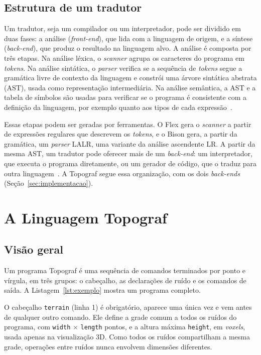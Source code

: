 \documentclass[sigconf, nonacm, screen, language=portuguese, language={main=english}]{acmart}
\begin{document}
\subsection{Estrutura de um tradutor}\label{sec:compiladores}
Um tradutor, seja um compilador ou um interpretador, pode ser dividido
em duas fases: a análise
(\textit{front-end}), que lida com a linguagem de origem, e a síntese
(\textit{back-end}), que produz o resultado na linguagem
alvo. A análise é composta por três etapas. Na análise
léxica, o \textit{scanner} agrupa os caracteres do programa em
\textit{tokens}. Na análise sintática, o \textit{parser} verifica se a
sequência de \textit{tokens} segue a gramática livre de contexto da
linguagem e constrói uma árvore sintática abstrata (AST), usada como
representação intermediária. Na análise semântica, a AST e a tabela de
símbolos são usadas para verificar se o programa é consistente com a
definição da linguagem, por exemplo quanto aos tipos de cada
expressão~\cite{ladeira, cooper2014}.

Essas etapas podem ser geradas por ferramentas. O Flex gera o
\textit{scanner} a partir de expressões regulares que descrevem os
\textit{tokens}, e o Bison gera, a partir da gramática, um
\textit{parser} LALR, uma variante da análise ascendente
LR. A partir da mesma AST, um tradutor pode oferecer mais
de um \textit{back-end}: um interpretador, que executa o programa
diretamente, ou um gerador de código, que o traduz para outra
linguagem~\cite{ladeira, grune2012}. A Topograf segue essa organização, com os dois
\textit{back-ends} (Seção~\ref{sec:implementacao}).

\section{A Linguagem Topograf}\label{sec:linguagem}

\subsection{Visão geral}\label{sec:visao}
Um programa Topograf é uma sequência de comandos terminados por
ponto e vírgula, em três grupos: o cabeçalho, as declarações de ruído e
os comandos de saída. A Listagem~\ref{lst:exemplo} mostra um programa
completo.

O cabeçalho \texttt{terrain} (linha 1) é obrigatório, aparece uma única
vez e vem antes de qualquer outro comando. Ele define a grade comum a
todos os ruídos do programa, com \texttt{width} $\times$ \texttt{length}
pontos, e a altura máxima \texttt{height}, em \textit{voxels}, usada
apenas na visualização 3D. Como todos os ruídos compartilham a mesma
grade, operações entre ruídos nunca envolvem dimensões diferentes.
\end{document}
